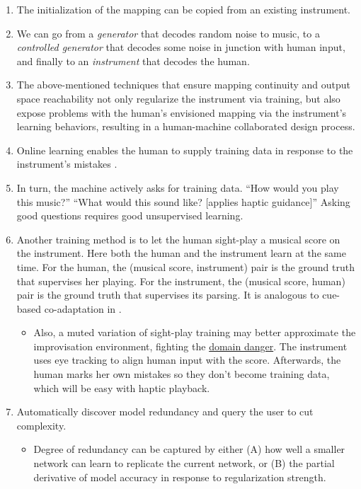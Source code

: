 \documentclass{article}
\begin{document}
\begin{enumerate}
\item The initialization of the mapping can be copied from an existing instrument. 
\item We can go from a \textit{generator} that decodes random noise to music, to a \textit{controlled generator} that decodes some noise in junction with human input, and finally to an \textit{instrument} that decodes the human. 
\item The above-mentioned techniques that ensure mapping continuity and output space reachability not only regularize the instrument via training, but also expose problems with the human’s envisioned mapping via the instrument’s learning behaviors, resulting in a human-machine collaborated design process. 
\item Online learning enables the human to supply training data in response to the instrument’s mistakes \cite{fiebrink_model_eval}. 
\item In turn, the machine actively asks for training data. “How would you play this music?” “What would this sound like? [applies haptic guidance]” Asking good questions requires good unsupervised learning. 
\item Another training method is to let the human sight-play a musical score on the instrument. Here both the human and the instrument learn at the same time. For the human, the (musical score, instrument) pair is the ground truth that supervises her playing. For the instrument, the (musical score, human) pair is the ground truth that supervises its parsing. It is analogous to cue-based co-adaptation in \cite{cue_co_adaptive_BCI}. 
\begin{itemize}
\item Also, a muted variation of sight-play training may better approximate the improvisation environment, fighting the \hyperref[itm:domain_danger]{domain danger}. The instrument uses eye tracking to align human input with the score. Afterwards, the human marks her own mistakes so they don’t become training data, which will be easy with haptic playback. 
\end{itemize}
\item Automatically discover model redundancy and query the user to cut complexity. 
\begin{itemize}
\item Degree of redundancy can be captured by either (A) how well a smaller network can learn to replicate the current network, or (B) the partial derivative of model accuracy in response to regularization strength. 

\end{itemize}
\end{enumerate}
\end{document}
